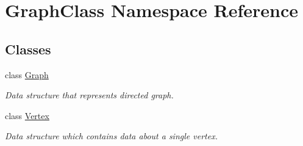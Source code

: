 \hypertarget{namespace_graph_class}{}\section{Graph\+Class Namespace Reference}
\label{namespace_graph_class}
\subsection*{Classes}
\begin{DoxyCompactItemize}
\item 
class \hyperlink{class_graph_class_1_1_graph}{Graph}
\begin{DoxyCompactList}\small\item\em Data structure that represents directed graph. \end{DoxyCompactList}\item 
class \hyperlink{class_graph_class_1_1_vertex}{Vertex}
\begin{DoxyCompactList}\small\item\em Data structure which contains data about a single vertex. \end{DoxyCompactList}\end{DoxyCompactItemize}
